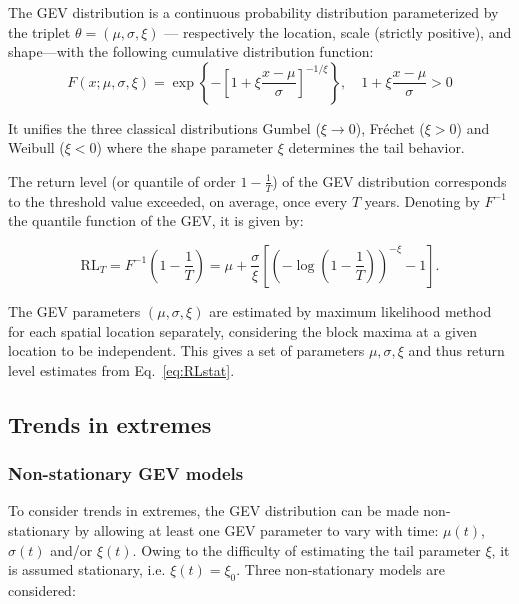 \documentclass[hess, manuscript]{copernicus}
\begin{document}
The GEV distribution is a continuous
probability distribution parameterized by the triplet
\(\theta = (\mu, \sigma, \xi)\) --- respectively the location, scale
(strictly positive), and shape---with the following cumulative
distribution function: \[
F(x;\mu ,\sigma ,\xi) = \exp\left\{-\left[1 + \xi\frac{x - \mu}{\sigma}\right]^{-1/\xi}\right\}, \quad 1 + \xi\frac{x - \mu}{\sigma} > 0
\]

It unifies the three classical distributions Gumbel (\(\xi \to 0\)), Fréchet (\(\xi > 0\)) and Weibull (\(\xi < 0\)) where the shape parameter \(\xi\) determines the tail behavior.

The return level (or quantile of order \(1 - \tfrac{1}{T}\)) of the GEV
distribution corresponds to the threshold value exceeded, on
average, once every \(T\) years. 
Denoting by $F^{-1}$ the quantile function of the GEV, it is given by:

\begin{equation}\label{eq:RLstat}
\mathrm{RL}_{T}
= F^{-1}\!\left(1 - \frac{1}{T}\right)
= \mu + \frac{\sigma}{\xi}
\left[
\left(
-\log\!\left(1 - \frac{1}{T}\right)
\right)^{-\xi}
- 1
\right].
\end{equation}


The GEV parameters $(\mu,\sigma,\xi)$ are estimated by maximum likelihood method for each
spatial location separately, considering the block maxima at a given
location to be independent. This gives a set of parameters $\mu,\sigma,\xi$ and thus
return level estimates from Eq.~\ref{eq:RLstat}.

\subsection{Trends in extremes}\label{trends-in-extremes}

\subsubsection{Non-stationary GEV models}\label{non-stationary-gev}

To consider trends in extremes, the GEV distribution can be made non-stationary
by allowing at least one GEV parameter to vary with time: $\mu(t)$, $\sigma(t)$
and/or $\xi(t)$. Owing to the difficulty of estimating the tail parameter $\xi$,
it is assumed stationary, i.e. $\xi(t) = \xi_0$. Three non-stationary models are
considered:
\end{document}
